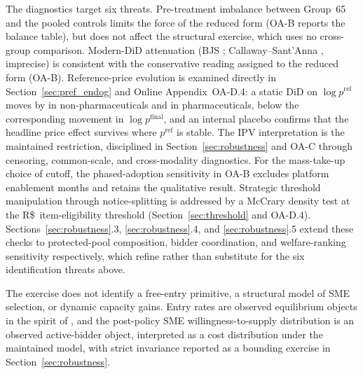 The diagnostics target six threats. Pre-treatment imbalance between
Group~65 and the pooled controls limits the force of the reduced form
(OA-B reports the balance table), but does not affect the structural
exercise, which uses no cross-group comparison. Modern-DiD attenuation
(BJS \didAltBjsEst{}; Callaway--Sant'Anna \didAltCsEst{}, imprecise) is
consistent with the conservative reading assigned to the reduced form
(OA-B). Reference-price evolution
is examined directly in Section~\ref{sec:pref_endog} and Online
Appendix~OA-D.4: a static DiD on $\log p^{\mathrm{ref}}$ moves by
\pRefDidEstNp{} in non-pharmaceuticals and \pRefDidEstPh{} in
pharmaceuticals, below the corresponding movement in
$\log p^{\mathrm{final}}$, and an internal placebo confirms that the
headline price effect survives where $p^{\mathrm{ref}}$ is stable. The
IPV interpretation is the maintained restriction, disciplined in
Section~\ref{sec:robustness} and OA-C through censoring, common-scale,
and cross-modality diagnostics. For the mass-take-up choice of cutoff, the
phased-adoption sensitivity in OA-B excludes platform enablement months
and retains the qualitative result. Strategic threshold manipulation
through notice-splitting is addressed by a McCrary density test at the
R\$\,\setAsideThreshBRL{} item-eligibility threshold
(Section~\ref{sec:threshold} and OA-D.4). Sections~\ref{sec:robustness}.3,
\ref{sec:robustness}.4, and \ref{sec:robustness}.5 extend these checks to
protected-pool composition, bidder coordination, and welfare-ranking
sensitivity respectively, which refine rather than substitute for the
six identification threats above.

The exercise does not identify a free-entry primitive, a structural model
of SME selection, or dynamic capacity gains. Entry rates are observed
equilibrium objects in the spirit of \citet{atheyseira2011}, and the
post-policy SME willingness-to-supply distribution is an observed
active-bidder object, interpreted as a cost distribution under the
maintained model, with strict invariance reported as a bounding exercise
in Section~\ref{sec:robustness}.
